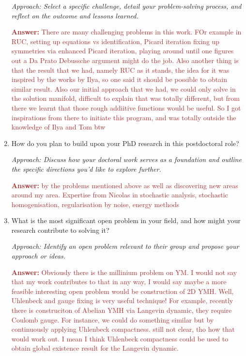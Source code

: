 \documentclass[12pt]{article}
\numberwithin{equation}{section}
\newcommand{\brown}[1]{\textcolor{brown}{#1}}
\begin{document}
\begin{enumerate}
    \textit{Approach: Select a specific challenge, detail your problem-solving process, and reflect on the outcome and lessons learned.}

    \brown{\textbf{Answer:} There are many challenging problems in this work. FOr example in RUC, setting up equations vs  identification, Picard iteration fixing up symmetries via enhanced Picard iteration, playing around until one figures out a Da Prato Debussche argument might do the job. Also another thing is that the result that we had, namely RUC as it stands, the idea for it was inspired by the works by Ilya, so one said it should be possible to obtain similar result. Also our initial approach that we had, we could only solve in the solution manifold, difficult to explain that was totally different, but from there we learnt that those rough addiitive functions would be useful. So I got inspirations from there to  initiate this program, and was totally outside the knowledge of Ilya and Tom btw}
    
    \item How do you plan to build upon your PhD research in this postdoctoral role?
    
    \textit{Approach: Discuss how your doctoral work serves as a foundation and outline the specific directions you'd like to explore further.}

    \brown{\textbf{Answer:} by the problems mentioned above as well as discovering new areas around my area. Expertise from Nicolas in stochastic analysis, stochastic homogenisation, regularisation by noise, energy methods}

    \item What is the most significant open problem in your field, and how might your research contribute to solving it?
    
    \textit{Approach: Identify an open problem relevant to their group and propose your approach or ideas.}

    \brown{\textbf{Answer:} Obviously there is the millinium problem on YM. I would not say that my work contributes to that in any way, I would say maybe a more feasible interesting open problem would be construction of 2D YMH. Well, Uhlenbeck and gauge fixing is very useful technique! For example, recently there is construciton of Abelian YMH via Langevin dynamic, they require Coulomb gauge. For instance, we could do something similar but by continuously applying Uhlenbeck compactness. still not clear, tho how that would work out. I mean I think Uhlenbeck compactness could be used to obtain global existence result for the Langevin dynamic.}


\end{enumerate}
\end{document}
